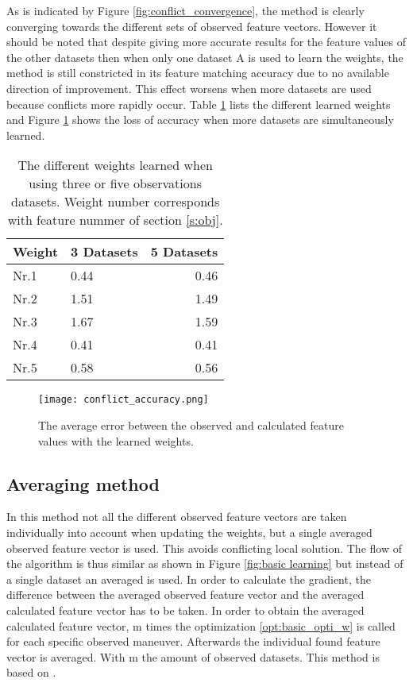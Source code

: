  As is indicated by Figure \ref{fig:conflict_convergence}, the method is clearly converging towards the different sets of observed feature vectors. However it should be noted that despite giving more accurate results for the feature values of the other datasets then when only one dataset A is used to learn the weights, the method is still constricted in its feature matching accuracy due to no available direction of improvement. This effect worsens when more datasets are used because conflicts more rapidly occur. Table \ref{table:conflict_weights} lists the different learned weights and Figure \ref{fig:conflict_accuracy} shows the loss of accuracy when more datasets are simultaneously learned.
 
\begin{table}
\centering
\begin{tabular}{@{}llr@{}} 
  Weight    & 3 Datasets & 5 Datasets\\ \midrule
  Nr.1      & \hspace{7mm}0.44    & 0.46 \\
  Nr.2      & \hspace{7mm}1.51    & 1.49 \\
  Nr.3      & \hspace{7mm}1.67    & 1.59 \\
  Nr.4      & \hspace{7mm}0.41    & 0.41 \\
  Nr.5      & \hspace{7mm}0.58    & 0.56 \\ \bottomrule
\end{tabular}
\caption{The different weights learned when using three or five observations datasets. Weight number corresponds with feature nummer of section \ref{s:obj}.}
\label{table:conflict_weights}
\end{table}

\begin{figure}[h!]
	\centering
	\texttt{[image: conflict\_accuracy.png]}
	\caption{The average error between the observed and calculated feature values with the learned weights.}
	\label{fig:conflict_accuracy}
\end{figure}

 \subsection{Averaging method}
 In this method not all the different observed feature vectors are taken individually into account when updating the weights, but a single averaged observed feature vector is used. This avoids conflicting local solution. The flow of the algorithm is thus similar as shown in Figure \ref{fig:basic learning} but instead of a single dataset an averaged is used. In order to calculate the gradient, the difference between the averaged observed feature vector and the averaged calculated feature vector has to be taken. In order to obtain the averaged calculated feature vector, m times the optimization \ref{opt:basic_opti_w} is called for each specific observed maneuver. Afterwards the individual found feature vector is averaged. With m the amount of observed datasets. This method is based on \cite{Kuderer2015a}.\\
 
